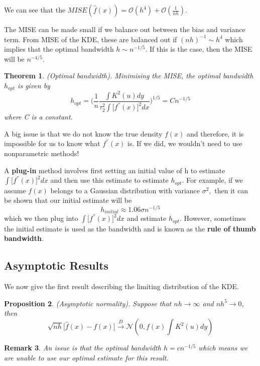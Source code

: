 \documentclass[twoside]{article}
\newcounter{lecnum}
\newtheorem{theorem}{Theorem}[lecnum]
\newtheorem{proposition}[theorem]{Proposition}
\newtheorem{remark}[theorem]{Remark}
\begin{document}
We can see that the $MISE(\hat{f}(x)) = \mathcal{O}(h^4) + \mathcal{O}(\frac{1}{nh}).$


The MISE can be made small if we balance out between the bias and variance term. From MISE of the KDE, these are balanced out if $(nh)^{-1} \sim h^4$ which implies that the optimal bandwidth $h \sim n^{-1/5}$. If this is the case, then the MISE will be $n^{-4/5}.$

\begin{theorem}(Optimal bandwidth). Minimising the MISE, the optimal bandwidth $h_{opt}$ is given by 
$$
h_{opt}=\bigg(\frac{1}{n} \frac{\int K^2(u)dy}{\tau_{2}^{2} \int \big[f^{''}(x) \big]^2dx} \bigg)^{1/5} = C n^{-1/5}
$$
where C is a constant.
\end{theorem}

A big issue is that we do not know the true density $f(x)$ and therefore, it is impossible for us to know what $f^{''}(x)$ is. If we did, we wouldn't need to use nonparametric methods!


A \textbf{plug-in} method involves first setting an initial value of h to estimate $\int \big[f^{''}(x)]^2dx$ and then use this estimate to estimate $h_{opt}.$ For example, if we assume $f(x)$ belongs to a Gaussian distribution with variance $\sigma^2,$ then it can be shown that our initial estimate will be 
$$
h_{initial} \approx 1.06 \sigma n^{-1/5}
$$
which we then plug into $\int \big[f^{''}(x)]^2dx$ and estimate $h_{opt}.$ However, sometimes the initial estimate is used as the bandwidth and is known as the \textbf{rule of thumb bandwidth}.

\subsection{Asymptotic Results}

We now give the first result describing the limiting distribution of the KDE.

\begin{proposition}(Asymptotic normality). Suppose that $nh \rightarrow \infty$ and $nh^5 \rightarrow 0$, then 
$$
\sqrt{nh}\big[\hat{f}(x) - f(x) \big] \xrightarrow{D} \mathcal{N}(0, f(x)\int K^2(u)dy)
$$
\end{proposition}

\begin{remark} An issue is that the optimal bandwidth $h = cn^{-1/5}$ which means we are unable to use our optimal estimate for this result. 
\end{remark}
\end{document}
